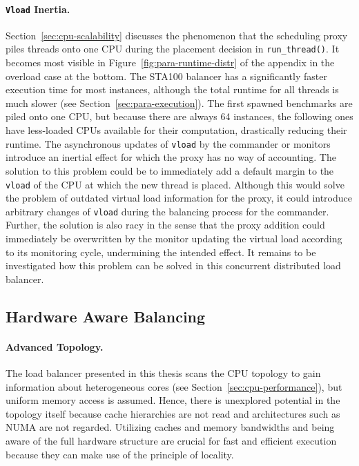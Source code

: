 \paragraph{\texttt{Vload} Inertia.}

Section~\ref{sec:cpu-scalability} discusses the phenomenon that the scheduling proxy piles threads onto one CPU during the placement decision in \texttt{run\_thread()}.
It becomes most visible in Figure~\ref{fig:para-runtime-distr} of the appendix in the overload case at the bottom.
The STA100 balancer has a significantly faster execution time for most instances, although the total runtime for all threads is much slower (see Section~\ref{sec:para-execution}).
The first spawned benchmarks are piled onto one CPU, but because there are always 64 instances, the following ones have less-loaded CPUs available for their computation, drastically reducing their runtime.
The asynchronous updates of \texttt{vload} by the commander or monitors introduce an inertial effect for which the proxy has no way of accounting.
The solution to this problem could be to immediately add a default margin to the \texttt{vload} of the CPU at which the new thread is placed.
Although this would solve the problem of outdated virtual load information for the proxy, it could introduce arbitrary changes of \texttt{vload} during the balancing process for the commander.
Further, the solution is also racy in the sense that the proxy addition could immediately be overwritten by the monitor updating the virtual load according to its monitoring cycle, undermining the intended effect.
It remains to be investigated how this problem can be solved in this concurrent distributed load balancer.

\subsection{Hardware Aware Balancing}

\paragraph{Advanced Topology.}

The load balancer presented in this thesis scans the CPU topology to gain information about heterogeneous cores (see Section~\ref{sec:cpu-performance}), but uniform memory access is assumed.
Hence, there is unexplored potential in the topology itself because cache hierarchies are not read and architectures such as NUMA are not regarded.
Utilizing caches and memory bandwidths and being aware of the full hardware structure are crucial for fast and efficient execution because they can make use of the principle of locality.

